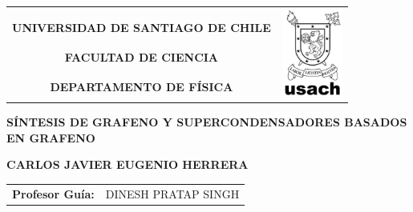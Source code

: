 \documentclass[12pt]{book}
\begin{document}
\renewcommand{\contentsname}{Tabla de contenidos}	%
\renewcommand{\listfigurename}{Índice de Ilustraciones}	%
\renewcommand{\indexname}{Índice analítico}		%
\renewcommand{\listtablename}{Índice de tablas}
\renewcommand{\tablename}{Tabla}

\begin{titlepage}
  \begin{flushright}
    \begin{tabular}{cl}
      &\multirow{4}{*}{\hspace{0cm}\includegraphics[width=2cm]{logoBN.png}}\\
      \large{\textbf{UNIVERSIDAD DE SANTIAGO DE CHILE}}&  \\
      \textbf{FACULTAD DE CIENCIA}&\\
      \textbf{DEPARTAMENTO DE FÍSICA}& \\
    \end{tabular}
  \end{flushright}

\vspace*{3cm}

  \begin{center}
    \large{\textbf{SÍNTESIS DE GRAFENO Y SUPERCONDENSADORES BASADOS EN GRAFENO}}\\ %
  \end{center}
  \begin{center}
    \textbf{CARLOS JAVIER EUGENIO HERRERA}
  \end{center}

\vspace*{1cm}

  \begin{flushright}
    \begin{tabular}{ll}
      \textbf{Profesor Guía:}& DINESH PRATAP SINGH\\
    \end{tabular}
\\\vspace{3cm}


\end{flushright}
\end{titlepage}
\end{document}
